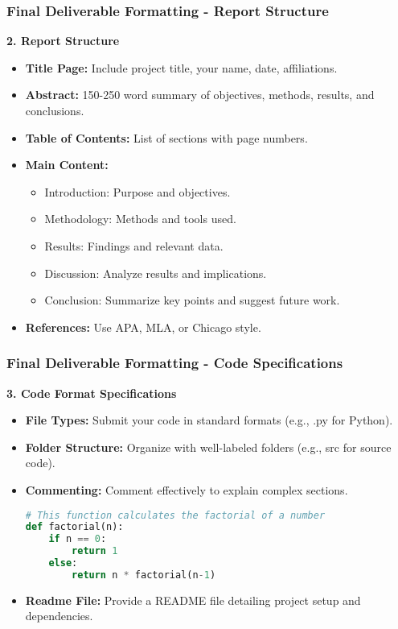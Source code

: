 \documentclass[aspectratio=169]{beamer}
\begin{document}
\begin{frame}[fragile]
    \frametitle{Final Deliverable Formatting - Report Structure}
    \textbf{2. Report Structure}
    \begin{itemize}
        \item \textbf{Title Page:} Include project title, your name, date, affiliations.
        \item \textbf{Abstract:} 150-250 word summary of objectives, methods, results, and conclusions.
        \item \textbf{Table of Contents:} List of sections with page numbers.
        \item \textbf{Main Content:}
            \begin{itemize}
                \item Introduction: Purpose and objectives.
                \item Methodology: Methods and tools used.
                \item Results: Findings and relevant data.
                \item Discussion: Analyze results and implications.
                \item Conclusion: Summarize key points and suggest future work.
            \end{itemize}
        \item \textbf{References:} Use APA, MLA, or Chicago style.
    \end{itemize}
\end{frame}

\begin{frame}[fragile]
    \frametitle{Final Deliverable Formatting - Code Specifications}
    \textbf{3. Code Format Specifications}
    \begin{itemize}
        \item \textbf{File Types:} Submit your code in standard formats (e.g., .py for Python).
        \item \textbf{Folder Structure:} Organize with well-labeled folders (e.g., src for source code).
        \item \textbf{Commenting:} Comment effectively to explain complex sections.
        \begin{lstlisting}[language=Python]
# This function calculates the factorial of a number
def factorial(n):
    if n == 0:
        return 1
    else:
        return n * factorial(n-1)
        \end{lstlisting}
        \item \textbf{Readme File:} Provide a README file detailing project setup and dependencies.
    \end{itemize}
\end{frame}
\end{document}
